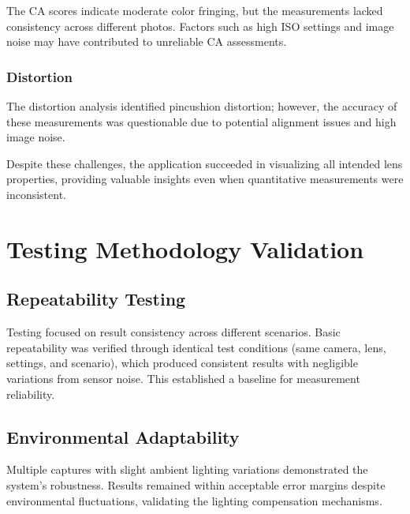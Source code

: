 The CA scores indicate moderate color fringing, but the measurements lacked consistency across different photos. Factors such as high ISO settings and image noise may have contributed to unreliable CA assessments.

\subsubsection{Distortion}
\begin{table}[H]
    \centering
    \caption{Distortion Assessment Scores}
    \label{tab:distortion_scores}
\end{table}

The distortion analysis identified pincushion distortion; however, the accuracy of these measurements was questionable due to potential alignment issues and high image noise.

Despite these challenges, the application succeeded in visualizing all intended lens properties, providing valuable insights even when quantitative measurements were inconsistent.

\section{Testing Methodology Validation}

\subsection{Repeatability Testing}
Testing focused on result consistency across different scenarios. Basic repeatability was verified through identical test conditions (same camera, lens, settings, and scenario), which produced consistent results with negligible variations from sensor noise. This established a baseline for measurement reliability.

\subsection{Environmental Adaptability}
Multiple captures with slight ambient lighting variations demonstrated the system's robustness. Results remained within acceptable error margins despite environmental fluctuations, validating the lighting compensation mechanisms.

